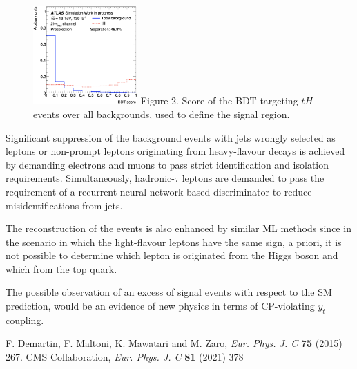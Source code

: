 \documentclass[a4paper,10pt]{article}
\newcommand{\yt}{\ensuremath{y_{t}}}
\newcommand{\tH}{\ensuremath{tH}}
\newcommand{\tHq}{\tH}
\begin{document}
\begin{figure}
	\includegraphics[width=4cm]{BDT_ScoreBDT_All_atLeast1b_croped}
	{\footnotesize Figure 2. Score of the BDT targeting \tHq$\,$ events over all backgrounds,
	used to define the signal region.}
\end{figure} 

Significant suppression of the background events with jets wrongly selected as leptons  
or non-prompt leptons originating from heavy-flavour decays
is achieved by demanding electrons and muons to pass strict identification and isolation requirements. 
Simultaneously, hadronic-$\tau$ leptons are demanded to pass the requirement of a
recurrent-neural-network-based discriminator to reduce misidentifications from jets.

The reconstruction of the events is also enhanced by similar ML methods
since in the scenario in which the light-flavour leptons have the same sign, a priori, 
it is not possible to determine which lepton is originated from the Higgs boson and 
which from the top quark.

The possible observation of an excess of signal events with respect to the SM prediction, would be an 
evidence of new physics in terms of CP-violating \yt$\,$ coupling.
\vspace{0.3 cm}

\medskip
{\small 
\noindent [1] F. Demartin, F. Maltoni, K. Mawatari and M. Zaro, \textit{Eur. Phys. J. C} \textbf{75}  (2015) 267. \newline
\noindent [2] CMS Collaboration, \textit{Eur. Phys. J. C} \textbf{81} (2021) 378
}


\end{document}
